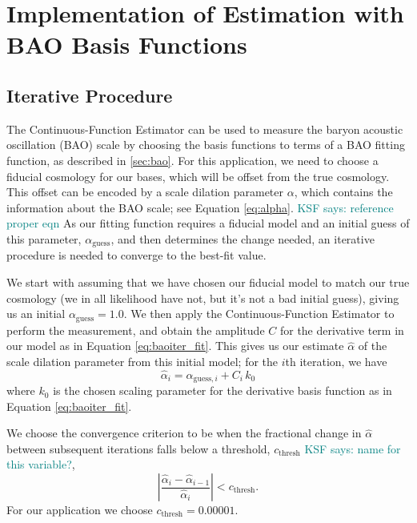 \documentclass[modern]{aastex62}
\newcommand{\Est}{The Continuous-Function Estimator\xspace}
\newcommand{\est}{the Continuous-Function Estimator\xspace}
\newcommand{\KSF}[1]{\textcolor{teal}{KSF says: #1}}
\begin{document}
\section{Implementation of Estimation with BAO Basis Functions}\label{sec:baoiter}

\subsection{Iterative Procedure}
\Est can be used to measure the baryon acoustic oscillation (BAO) scale by choosing the basis functions to terms of a BAO fitting function, as described in \ref{sec:bao}.
For this application, we need to choose a fiducial cosmology for our bases, which will be offset from the true cosmology.
This offset can be encoded by a scale dilation parameter $\alpha$, which contains the information about the BAO scale; see Equation \ref{eq:alpha}. \KSF{reference proper eqn}
As our fitting function requires a fiducial model and an initial guess of this parameter, $\alpha_\mathrm{guess}$, and then determines the change needed, an iterative procedure is needed to converge to the best-fit value.

We start with assuming that we have chosen our fiducial model to match our true cosmology (we in all likelihood have not, but it's not a bad initial guess), giving us an initial $\alpha_\mathrm{guess} = 1.0$. 
We then apply \est to perform the measurement, and obtain the amplitude $C$ for the derivative term in our model as in Equation \ref{eq:baoiter_fit}. 
This gives us our estimate $\hat{\alpha}$ of the scale dilation parameter from this initial model; for the $i$th iteration, we have
\begin{equation}
    \hat{\alpha}_{i} = \alpha_{\mathrm{guess},i} + C_i \, k_0
\end{equation}
where $k_0$ is the chosen scaling parameter for the derivative basis function as in Equation \ref{eq:baoiter_fit}.

We choose the convergence criterion to be when the fractional change in $\hat{\alpha}$ between subsequent iterations falls below a threshold, $c_\mathrm{thresh}$ \KSF{name for this variable?},
\begin{equation}
    \left| \frac{\hat{\alpha}_i - \hat{\alpha}_{i-1}}{\hat{\alpha}_i} \right| < c_\mathrm{thresh}.
\end{equation}
For our application we choose $c_\mathrm{thresh} = 0.00001$.
\end{document}
